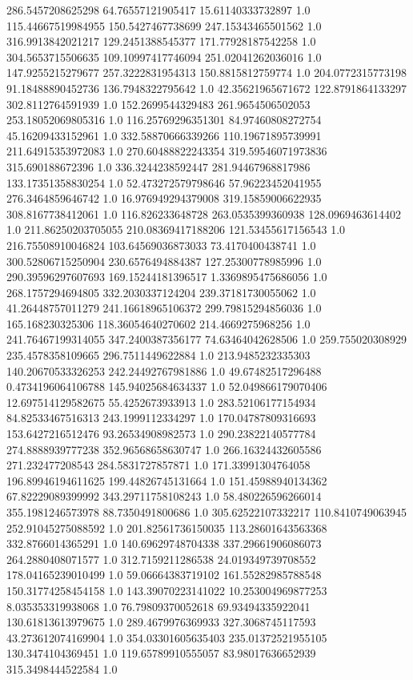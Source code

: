 286.5457208625298	64.76557121905417	15.61140333732897	1.0
115.44667519984955	150.5427467738699	247.15343465501562	1.0
316.9913842021217	129.2451388545377	171.77928187542258	1.0
304.5653715506635	109.10997417746094	251.02041262036016	1.0
147.9255215279677	257.3222831954313	150.8815812759774	1.0
204.0772315773198	91.18488890452736	136.7948322795642	1.0
42.35621965671672	122.8791864133297	302.8112764591939	1.0
152.2699544329483	261.9654506502053	253.18052069805316	1.0
116.25769296351301	84.97460808272754	45.16209433152961	1.0
332.58870666339266	110.19671895739991	211.64915353972083	1.0
270.60488822243354	319.59546071973836	315.690188672396	1.0
336.3244238592447	281.94467968817986	133.17351358830254	1.0
52.473272579798646	57.96223452041955	276.3464859646742	1.0
16.976949294379008	319.15859006622935	308.8167738412061	1.0
116.826233648728	263.0535399360938	128.0969463614402	1.0
211.86250203705055	210.08369417188206	121.53455617156543	1.0
216.75508910046824	103.64569036873033	73.4170400438741	1.0
300.52806715250904	230.6576494884387	127.25300778985996	1.0
290.39596297607693	169.15244181396517	1.3369895475686056	1.0
268.1757294694805	332.2030337124204	239.37181730055062	1.0
41.26448757011279	241.16618965106372	299.79815294856036	1.0
165.168230325306	118.36054640270602	214.4669275968256	1.0
241.76467199314055	347.2400387356177	74.63464042628506	1.0
259.755020308929	235.4578358109665	296.7511449622884	1.0
213.9485232335303	140.20670533326253	242.24492767981886	1.0
49.67482517296488	0.4734196064106788	145.94025684634337	1.0
52.049866179070406	12.697514129582675	55.4252673933913	1.0
283.52106177154934	84.82533467516313	243.1999112334297	1.0
170.04787809316693	153.6427216512476	93.26534908982573	1.0
290.23822140577784	274.8888939777238	352.96568658630747	1.0
266.16324432605586	271.232477208543	284.5831727857871	1.0
171.33991304764058	196.89946194611625	199.44826745131664	1.0
151.45988940134362	67.82229089399992	343.29711758108243	1.0
58.480226596266014	355.1981246573978	88.7350491800686	1.0
305.62522107332217	110.8410749063945	252.91045275088592	1.0
201.82561736150035	113.28601643563368	332.8766014365291	1.0
140.69629748704338	337.29661906086073	264.2880408071577	1.0
312.7159211286538	24.019349739708552	178.04165239010499	1.0
59.06664383719102	161.55282985788548	150.31774258454158	1.0
143.39070223141022	10.253004969877253	8.035353319938068	1.0
76.79809370052618	69.93494335922041	130.61813613979675	1.0
289.4679976369933	327.3068745117593	43.273612074169904	1.0
354.03301605635403	235.01372521955105	130.3474104369451	1.0
119.65789910555057	83.98017636652939	315.3498444522584	1.0
